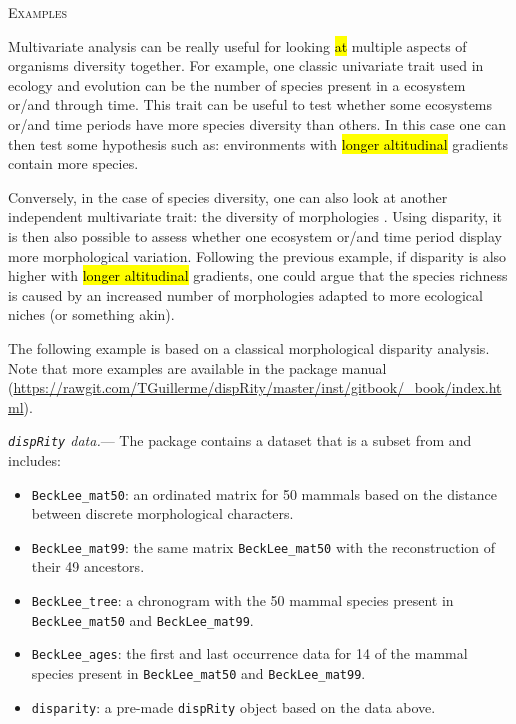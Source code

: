 \documentclass[12pt,letterpaper]{article}
\renewcommand{\section}[1]{%
\bigskip
\begin{center}
\begin{Large}
\normalfont\scshape #1
\medskip
\end{Large}
\end{center}}
\renewcommand{\subsubsection}[1]{%
\vspace{2ex}
\noindent
\textit{#1.}---}
\newcommand{\disp}{\texttt{dispRity} }
\begin{document}
\section{Examples}
Multivariate analysis can be really useful for looking
 \hl{at} 
 multiple aspects of organisms diversity together.
For example, one classic univariate trait used in ecology and evolution can be the number of species present in a ecosystem or/and through time.
This trait can be useful to test whether some ecosystems or/and time periods have more species diversity than others.
In this case one can then test some hypothesis such as: environments with
 \hl{longer altitudinal} 
 gradients contain more species.

Conversely, in the case of species diversity, one can also look at another independent multivariate trait: the diversity of morphologies \citep[or disparity;][]{foote1991morphological}.
Using disparity, it is then also possible to assess whether one ecosystem or/and time period display more morphological variation.
Following the previous example, if disparity is also higher with
 \hl{longer altitudinal} 
 gradients, one could argue that the species richness is caused by an increased number of morphologies adapted to more ecological niches (or something akin).

The following example is based on a classical morphological disparity analysis.
Note that more examples are available in the package manual (\url{https://rawgit.com/TGuillerme/dispRity/master/inst/gitbook/_book/index.html}).

\subsubsection{\disp data}
The package contains a dataset that is a subset from \cite{beckancient2014} and includes:

\begin{itemize}
    \item \texttt{BeckLee\_mat50}: an ordinated matrix for 50 mammals based on the distance between discrete morphological characters.
    \item \texttt{BeckLee\_mat99}: the same matrix \texttt{BeckLee\_mat50} with the reconstruction of their 49 ancestors.
    \item \texttt{BeckLee\_tree}: a chronogram with the 50 mammal species present in \texttt{BeckLee\_mat50} and \texttt{BeckLee\_mat99}.
    \item \texttt{BeckLee\_ages}: the first and last occurrence data for 14 of the mammal species present in \texttt{BeckLee\_mat50} and \texttt{BeckLee\_mat99}.
    \item \texttt{disparity}: a pre-made \disp object based on the data above.
\end{itemize}
\end{document}
